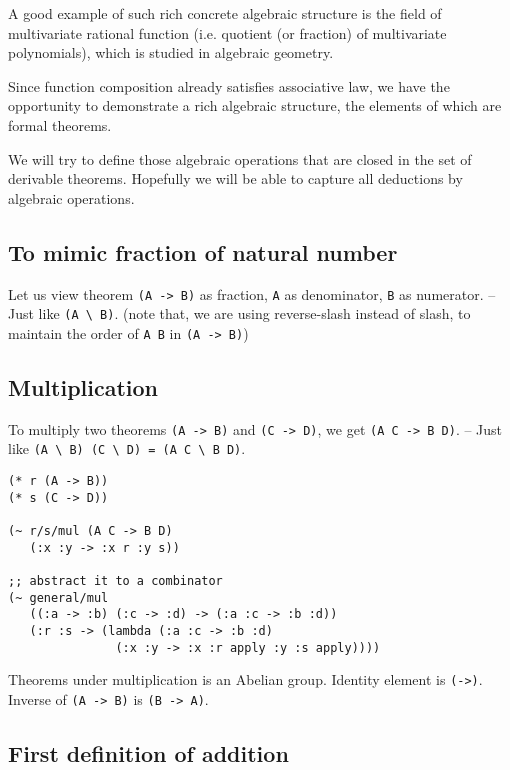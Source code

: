 \documentclass[numbers]{sigplanconf}
\begin{document}
A good example of such rich concrete algebraic structure
is the field of multivariate rational function
(i.e. quotient (or fraction) of multivariate polynomials),
which is studied in algebraic geometry.

Since function composition already satisfies associative law,
we have the opportunity to demonstrate a rich algebraic structure,
the elements of which are formal theorems.

We will try to define those algebraic operations that are closed in the set of derivable theorems.
Hopefully we will be able to capture all deductions by algebraic operations.

\subsection{To mimic fraction of natural number}

Let us view theorem {\scriptsize\verb|(A -> B)|} as fraction,
{\scriptsize\verb|A|} as denominator,
{\scriptsize\verb|B|} as numerator.
-- Just like {\scriptsize\verb|(A \ B)|}.
(note that,
we are using reverse-slash instead of slash,
to maintain the order of {\scriptsize\verb|A B|} in {\scriptsize\verb|(A -> B)|})

\subsection{Multiplication}

To multiply two theorems {\scriptsize\verb|(A -> B)|} and {\scriptsize\verb|(C -> D)|},
we get {\scriptsize\verb|(A C -> B D)|}.
-- Just like {\scriptsize\verb|(A \ B) (C \ D) = (A C \ B D)|}.

{\scriptsize\begin{verbatim}
(* r (A -> B))
(* s (C -> D))

(~ r/s/mul (A C -> B D)
   (:x :y -> :x r :y s))

;; abstract it to a combinator
(~ general/mul
   ((:a -> :b) (:c -> :d) -> (:a :c -> :b :d))
   (:r :s -> (lambda (:a :c -> :b :d)
               (:x :y -> :x :r apply :y :s apply))))
\end{verbatim}}

Theorems under multiplication is an Abelian group.
Identity element is {\scriptsize\verb|(->)|}.
Inverse of {\scriptsize\verb|(A -> B)|} is {\scriptsize\verb|(B -> A)|}.

\subsection{First definition of addition}
\end{document}
